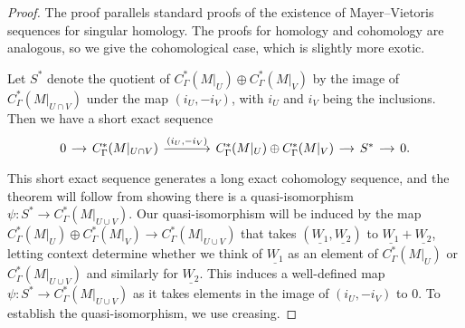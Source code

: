 \begin{proof}
	The proof parallels standard proofs of the existence of Mayer--Vietoris sequences for singular homology.
	The proofs for homology and cohomology are analogous, so we give the cohomological case, which is slightly more exotic.

	Let $S^*$ denote the quotient of $C_{\Gamma}^*(M|_U) \oplus C_{\Gamma}^{*}(M|_V)$ by the image of $C_{\Gamma}^*(M|_{U \cap V})$ under the map $(i_U, -i_V)$, with $i_U$ and $i_V$ being the inclusions.
	Then we have a short exact sequence
	\begin{equation}\label{E: homology MV SES}
		\begin{tikzcd}[
			column sep = small,
			arrow style = math font,
			cells = {nodes = {text height = 2ex,text depth = 0.75ex}}
			]
			0 \arrow[r] &
			C_{\Gamma}^{*}(M|_{U \cap V}) \arrow[r, "(i_U{,}-i_V)"] &[25pt]
			C_{\Gamma}^*(M|_U) \oplus C_{\Gamma}^{*}(M|_V) \arrow[r] &
			S^* \arrow[r] &
			0.
		\end{tikzcd}
	\end{equation}
	This short exact sequence generates a long exact cohomology sequence, and the theorem will follow from showing there is a quasi-isomorphism $\psi \colon S^* \to C_{\Gamma}^*(M|_{U \cup V})$.
	Our quasi-isomorphism will be induced by the map $C_{\Gamma}^*(M|_U) \oplus C_{\Gamma}^{*}(M|_V) \to C_{\Gamma}^*(M|_{U \cup V})$ that takes $(\underline{W_1}, \underline{W_2})$ to $\underline{W_1}+\underline{W_2}$, letting context determine whether we think of $\underline{W_1}$ as an element of $C_{\Gamma}^*(M|_U)$ or $C_{\Gamma}^*(M|_{U \cup V})$ and similarly for $\underline{W_2}$.
	This induces a well-defined map $\psi \colon S^* \to C_{\Gamma}^*(M|_{U \cup V})$ as it takes elements in the image of $(i_U,-i_V)$ to $0$.
	To establish the quasi-isomorphism, we use creasing.


\end{proof}
